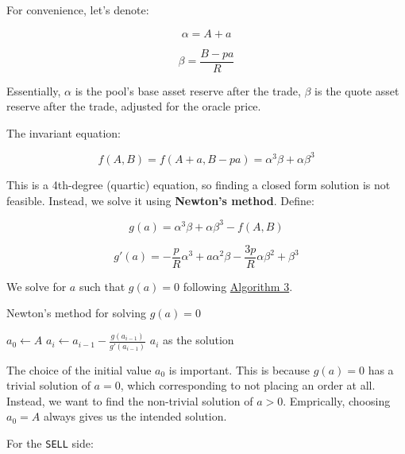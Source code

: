 \documentclass{article}
\begin{document}
For convenience, let's denote:

\begin{equation}
  \alpha = A + a
\end{equation}

\begin{equation}
  \beta = \frac{B - p a}{R}
\end{equation}

Essentially, $\alpha$ is the pool's base asset reserve after the trade, $\beta$ is the quote asset reserve after the trade, adjusted for the oracle price.

The invariant equation:

\begin{equation}
  f(A, B) = f(A + a, B - p a) = \alpha^3 \beta + \alpha \beta^3
\end{equation}

This is a 4th-degree (quartic) equation, so finding a closed form solution is not feasible. Instead, we solve it using \textbf{Newton's method}. Define:

\begin{equation}
  g(a) = \alpha^3 \beta + \alpha \beta^3 - f(A, B)
\end{equation}

\begin{equation}
  g'(a) = -\frac{p}{R} \alpha^3 + a \alpha^2 \beta - \frac{3p}{R} \alpha \beta^2 + \beta^3
\end{equation}

We solve for $a$ such that $g(a) = 0$ following \hyperref[alg:3]{Algorithm 3}.

\begin{algorithm}
  \caption{Newton's method for solving $g(a) = 0$}
  \label{alg:3}
  \begin{algorithmic}
    \State $a_0 \gets A$
    \State $a_i \gets a_{i-1} - \frac{g(a_{i-1})}{g'(a_{i-1})}$
    \State \Return $a_i$ as the solution
    \EndIf
    \EndFor
  \end{algorithmic}
\end{algorithm}

The choice of the initial value $a_0$ is important. This is because $g(a) = 0$ has a trivial solution of $a = 0$, which corresponding to not placing an order at all. Instead, we want to find the non-trivial solution of $a > 0$. Emprically, choosing $a_0 = A$ always gives us the intended solution.

For the \texttt{SELL} side:
\end{document}
